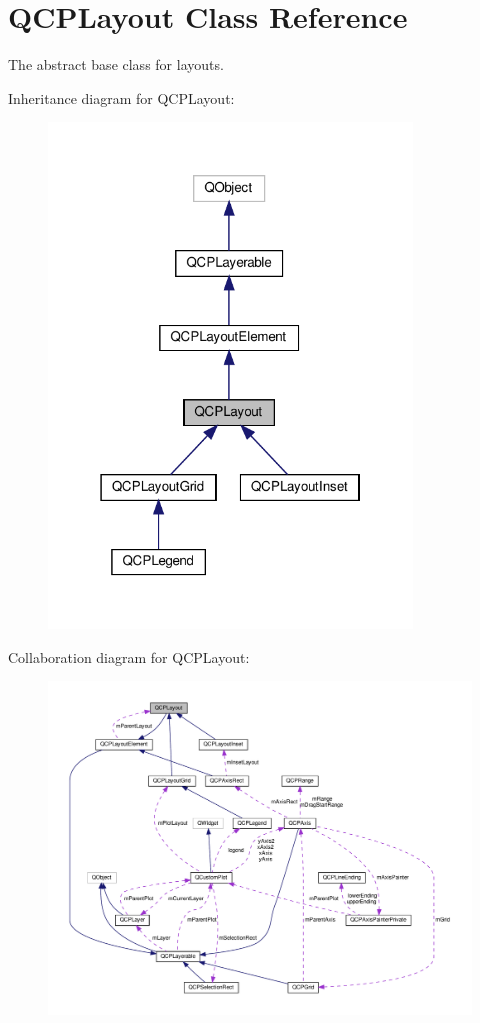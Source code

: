 \hypertarget{classQCPLayout}{}\section{Q\+C\+P\+Layout Class Reference}
\label{classQCPLayout}


The abstract base class for layouts.  




Inheritance diagram for Q\+C\+P\+Layout\+:\nopagebreak
\begin{figure}[H]
\begin{center}
\leavevmode
\includegraphics[width=274pt]{classQCPLayout__inherit__graph}
\end{center}
\end{figure}


Collaboration diagram for Q\+C\+P\+Layout\+:\nopagebreak
\begin{figure}[H]
\begin{center}
\leavevmode
\includegraphics[width=350pt]{classQCPLayout__coll__graph}
\end{center}
\end{figure}
